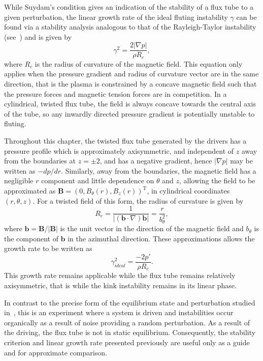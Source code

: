 \documentclass[12pt]{article}
\renewcommand{\vec}[1]{{\bm #1}}
\begin{document}
While Suydam's condition gives an indication of the stability of a flux tube to a given perturbation, the linear growth rate of the ideal fluting instability $\gamma$ can be found via a stability analysis analogous to that of the Rayleigh-Taylor instability (see~\cite{goldstonIntroductionPlasmaPhysics2020}) and is given by
\begin{equation}
  \label{eq:fluting_growth_rate}
\gamma^2 = \frac{2|\nabla p|}{\rho R_c},
\end{equation}
where $R_c$ is the radius of curvature of the magnetic field. This equation only applies when the pressure gradient and radius of curvature vector are in the same direction, that is the plasma is constrained by a concave magnetic field such that the pressure forces and magnetic tension forces are in competition. In a cylindrical, twisted flux tube, the field is always concave towards the central axis of the tube, so any inwardly directed pressure gradient is potentially unstable to fluting.

Throughout this chapter, the twisted flux tube generated by the drivers has a pressure profile which is approximately axisymmetric, and independent of $z$ away from the boundaries at $z=\pm2$, and has a negative gradient, hence $|\nabla p|$ may be written as $-d p/ dr$. Similarly, away from the boundaries, the magnetic field has a negligible $r$ component and little dependence on $\theta$ and $z$, allowing the field to be approximated as $\vec{B} = (0, B_{\theta}(r), B_z(r))^{\text{T}}$, in cylindrical coordinates $(r, \theta, z)$. For a twisted field of this form, the radius of curvature is given by 
\begin{equation}
  \label{eq:radius_of_curvature}
  R_c = \frac{1}{|(\vec{b}\cdot\nabla) \vec{b}|} = \frac{r}{b_{\theta}^2},
\end{equation}
where $\vec{b} = \vec{B}/|\vec{B}|$ is the unit vector in the direction of the magnetic field and $b_{\theta}$ is the component of $\vec{b}$ in the azimuthal direction. These approximations allows the growth rate to be written as
\begin{equation}
  \label{eq:fluting_growth_rate2}
\gamma_{ideal}^2 = \frac{-2p'}{\rho R_c}.
\end{equation}
This growth rate remains applicable while the flux tube remains relatively axisymmetric, that is while the kink instability remains in its linear phase.

In contrast to the precise form of the equilibrium state and perturbation studied in~\cite{quinnEffectAnisotropicViscosity2020a}, this is an experiment where a system is driven and instabilities occur organically as a result of noise providing a random perturbation. As a result of the driving, the flux tube is not in static equilibrium. Consequently, the stability criterion and linear growth rate presented previously are useful only as a guide and for approximate comparison.
\end{document}

